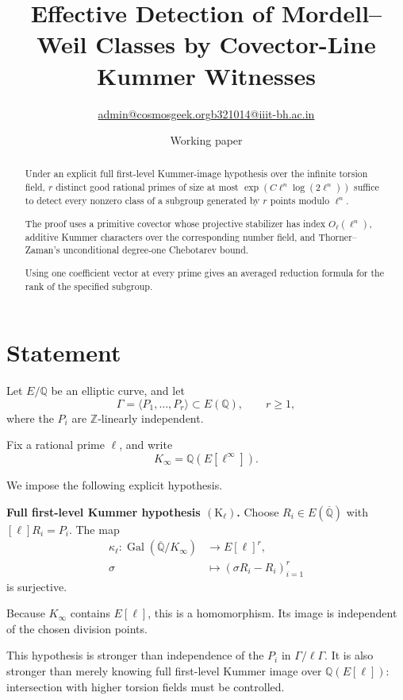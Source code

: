 \documentclass[11pt]{article}
\title{Effective Detection of Mordell--Weil Classes
by Covector-Line Kummer Witnesses}
\author{\small \href{mailto:admin@cosmosgeek.org}{admin@cosmosgeek.org}\qquad \href{mailto:b321014@iiit-bh.ac.in}{b321014@iiit-bh.ac.in}}
\date{Working paper}
\begin{document}
\maketitle

\begin{abstract}
Under an explicit full first-level Kummer-image
hypothesis over the infinite torsion field, $r$
distinct good rational primes of size at most
$\exp(C\ell^n\log(2\ell^n))$ suffice to detect every
nonzero class of a subgroup generated by $r$ points
modulo $\ell^n$.

The proof uses a primitive covector whose projective
stabilizer has index $O_\ell(\ell^n)$, additive Kummer
characters over the corresponding number field,
and Thorner--Zaman's unconditional degree-one
Chebotarev bound.

Using one coefficient vector at every prime gives an averaged reduction formula for the rank of the specified subgroup.
\end{abstract}

\section{Statement}

Let $E/\mathbb Q$ be an elliptic curve, and let
\[
\Gamma=\langle P_1,\ldots,P_r\rangle
\subset E(\mathbb Q),
\qquad r\ge1,
\]
where the $P_i$ are $\mathbb Z$-linearly independent.

Fix a rational prime $\ell$, and write
\[
K_\infty=\mathbb Q(E[\ell^\infty]).
\]

We impose the following explicit hypothesis.

\medskip
\noindent
\textbf{Full first-level Kummer hypothesis
$(\mathrm K_\ell)$.}
Choose $R_i\in E(\overline{\mathbb Q})$ with
$[\ell]R_i=P_i$. The map
\[
\begin{aligned}
\kappa_\ell:
\operatorname{Gal}(\overline{\mathbb Q}/K_\infty)
&\longrightarrow E[\ell]^r,\\
\sigma&\longmapsto
(\sigma R_i-R_i)_{i=1}^r
\end{aligned}
\]
is surjective.

Because $K_\infty$ contains $E[\ell]$, this is a
homomorphism. Its image is independent of the
chosen division points.

This hypothesis is stronger than independence of
the $P_i$ in $\Gamma/\ell\Gamma$. It is also stronger
than merely knowing full first-level Kummer image
over $\mathbb Q(E[\ell])$: intersection with higher
torsion fields must be controlled.
\end{document}
